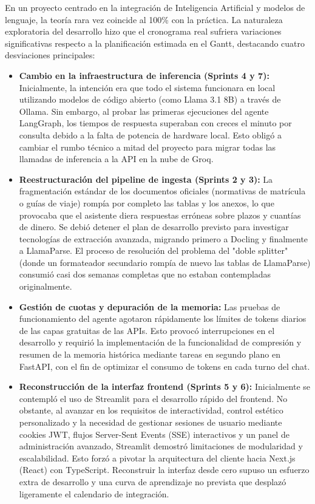 \documentclass[12pt,a4paper,oneside]{report}
\begin{document}
En un proyecto centrado en la integración de Inteligencia Artificial y modelos de lenguaje, la teoría rara vez coincide al 100\% con la práctica. La naturaleza exploratoria del desarrollo hizo que el cronograma real sufriera variaciones significativas respecto a la planificación estimada en el Gantt, destacando cuatro desviaciones principales:

\begin{itemize}
    \item \textbf{Cambio en la infraestructura de inferencia (Sprints 4 y 7):} Inicialmente, la intención era que todo el sistema funcionara en local utilizando modelos de código abierto (como Llama 3.1 8B) a través de Ollama. Sin embargo, al probar las primeras ejecuciones del agente LangGraph, los tiempos de respuesta superaban con creces el minuto por consulta debido a la falta de potencia de hardware local. Esto obligó a cambiar el rumbo técnico a mitad del proyecto para migrar todas las llamadas de inferencia a la API en la nube de Groq.
    
    \item \textbf{Reestructuración del pipeline de ingesta (Sprints 2 y 3):} La fragmentación estándar de los documentos oficiales (normativas de matrícula o guías de viaje) rompía por completo las tablas y los anexos, lo que provocaba que el asistente diera respuestas erróneas sobre plazos y cuantías de dinero. Se debió detener el plan de desarrollo previsto para investigar tecnologías de extracción avanzada, migrando primero a Docling y finalmente a LlamaParse. El proceso de resolución del problema del "doble splitter" (donde un formateador secundario rompía de nuevo las tablas de LlamaParse) consumió casi dos semanas completas que no estaban contempladas originalmente.
    
    \item \textbf{Gestión de cuotas y depuración de la memoria:} Las pruebas de funcionamiento del agente agotaron rápidamente los límites de tokens diarios de las capas gratuitas de las APIs. Esto provocó interrupciones en el desarrollo y requirió la implementación de la funcionalidad de compresión y resumen de la memoria histórica mediante tareas en segundo plano en FastAPI, con el fin de optimizar el consumo de tokens en cada turno del chat.
    
    \item \textbf{Reconstrucción de la interfaz frontend (Sprints 5 y 6):} Inicialmente se contempló el uso de Streamlit para el desarrollo rápido del frontend. No obstante, al avanzar en los requisitos de interactividad, control estético personalizado y la necesidad de gestionar sesiones de usuario mediante cookies JWT, flujos Server-Sent Events (SSE) interactivos y un panel de administración avanzado, Streamlit demostró limitaciones de modularidad y escalabilidad. Esto forzó a pivotar la arquitectura del cliente hacia Next.js (React) con TypeScript. Reconstruir la interfaz desde cero supuso un esfuerzo extra de desarrollo y una curva de aprendizaje no prevista que desplazó ligeramente el calendario de integración.
\end{itemize}
\end{document}
